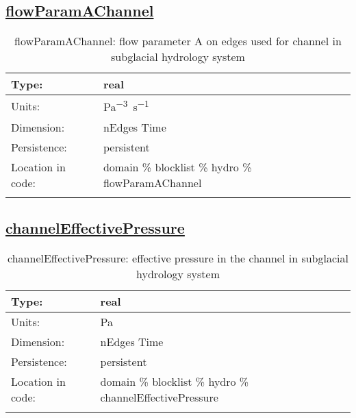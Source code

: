 \subsection[flowParamAChannel]{\hyperref[sec:var_tab_hydro]{flowParamAChannel}}
\label{subsec:var_sec_hydro_flowParamAChannel}
\begin{center}
\begin{longtable}{| p{2.0in} | p{4.0in} |}
        \hline 
        Type: & real \\
        \hline 
        Units: & \si{Pa^{-3}.s^{-1}} \\
        \hline 
        Dimension: & nEdges Time \\
        \hline 
        Persistence: & persistent \\
        \hline 
         Location in code: & domain \% blocklist \% hydro \% flowParamAChannel \\
         \hline 
    \caption{flowParamAChannel: flow parameter A on edges used for channel in subglacial hydrology system}
\end{longtable}
\end{center}
\subsection[channelEffectivePressure]{\hyperref[sec:var_tab_hydro]{channelEffectivePressure}}
\label{subsec:var_sec_hydro_channelEffectivePressure}
\begin{center}
\begin{longtable}{| p{2.0in} | p{4.0in} |}
        \hline 
        Type: & real \\
        \hline 
        Units: & \si{Pa} \\
        \hline 
        Dimension: & nEdges Time \\
        \hline 
        Persistence: & persistent \\
        \hline 
         Location in code: & domain \% blocklist \% hydro \% channelEffectivePressure \\
         \hline 
    \caption{channelEffectivePressure: effective pressure in the channel in subglacial hydrology system}
\end{longtable}
\end{center}
